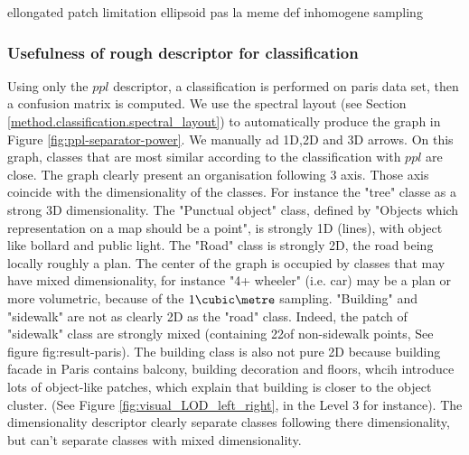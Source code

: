 		ellongated patch
		limitation ellipsoid
		pas la meme def
		inhomogene sampling
		
		
		
		
		
		
		
		\subsubsection{Usefulness of rough descriptor for classification}
		
		Using only the $ppl$ descriptor, a classification is performed on paris data set, then a confusion matrix is computed.
		We use the spectral layout (see Section \ref{method.classification.spectral_layout}) to automatically produce the graph in Figure \ref{fig:ppl-separator-power}. 
		We manually ad 1D,2D and 3D arrows.
		On this graph, classes that are most similar according to the classification with $ppl$ are close. The graph clearly present an organisation following 3 axis. Those axis coincide with the dimensionality of the classes. For instance the "tree" classe as a strong 3D dimensionality. The "Punctual object" class, defined by "Objects which representation on a map should be a point", is strongly 1D (lines), with object like bollard and public light. The "Road" class is strongly 2D, the road being locally roughly a plan. The center of the graph is occupied by classes that may have mixed dimensionality, for instance "4+ wheeler" (i.e. car) may be a plan or more volumetric, because of the $1 \cubic \metre$ sampling.
		"Building" and "sidewalk" are not as clearly 2D as  the "road" class. Indeed, the patch of "sidewalk" class are strongly mixed (containing 22\mypercent of non-sidewalk points, See figure fig:result-paris). The building class is also not pure 2D because building facade in Paris contains balcony, building decoration and floors, whcih introduce lots of object-like patches, which explain that building is closer to the object cluster. (See Figure \ref{fig:visual_LOD_left_right}, in the Level 3 for instance).
		The dimensionality descriptor clearly separate classes following there dimensionality, but can't separate classes with mixed dimensionality.
		
